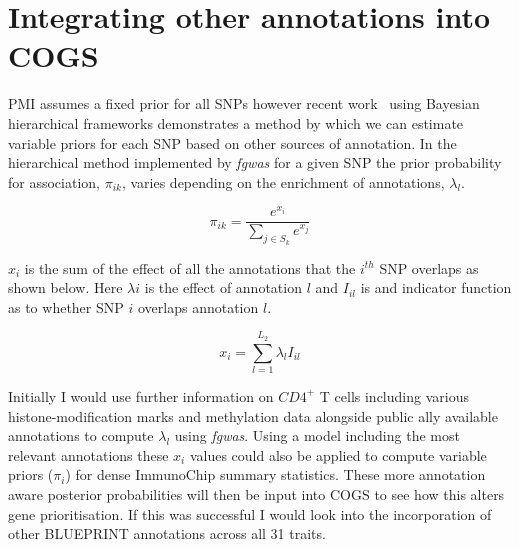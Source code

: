 \documentclass[a4paper,11pt]{report}
\begin{document}


\section{Integrating other annotations into COGS}

PMI assumes a fixed prior for all SNPs however recent work~\citep{Pickrell2014-xs} using Bayesian hierarchical frameworks demonstrates a method by which we can estimate variable priors for each SNP based on other sources of annotation. In the hierarchical method implemented by \textit{fgwas} for a given SNP the prior probability for association, $\pi_{ik}$, varies depending on the enrichment of annotations, $\lambda_{l}$. 

\begin{equation}
	\pi_{ik} = \frac{e^{x_{i}}}{\sum_{j \in S_k}e^{x_{j}}}
\end{equation}

$x_i$ is the sum of the effect of all the annotations that the $i^{th}$ SNP overlaps as shown below.  Here $\lambda{i}$ is the effect of annotation $l$ and $I_{il}$ is and indicator function as to whether SNP $i$ overlaps annotation $l$.  

\begin{equation}
	x_{i} = \sum_{l=1}^{L_{2}} \lambda_{l}I_{il}
\end{equation}

Initially I would use further information on $CD4^{+}$ T cells including various histone-modification marks and methylation data alongside public ally available annotations to compute $\lambda_{l}$ using \textit{fgwas}.
 Using a model including the most relevant annotations these $x_{i}$ values could also be applied to compute variable priors ($\pi_{i}$) for dense ImmunoChip summary statistics. These more annotation aware posterior probabilities will then be input into COGS to see how this alters gene prioritisation. If this was successful I would look into the incorporation of other BLUEPRINT annotations across all 31 traits.
 
\end{document}

